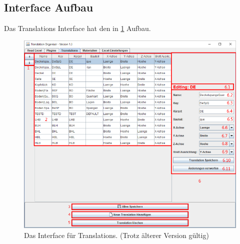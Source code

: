 \documentclass{book}
\begin{document}
			\subsection{Interface Aufbau}
				Das Translations Interface hat den in \hyperref[fig:translations normal]{\ref{fig:translations normal}} Aufbau.
				\begin{figure}
					\centering
					\includegraphics[scale=0.48]{pics/assisttool/translations-normal.png}
					\caption{Das Interface für Translations. \newline (Trotz älterer Version gültig)}
					\label{fig:translations normal}
				\end{figure}
\end{document}
